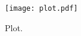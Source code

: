 

\begin{figure}
  \centering
  \texttt{[image: plot.pdf]}
  \caption{Plot.}
  \label{fig:plot}
\end{figure}
